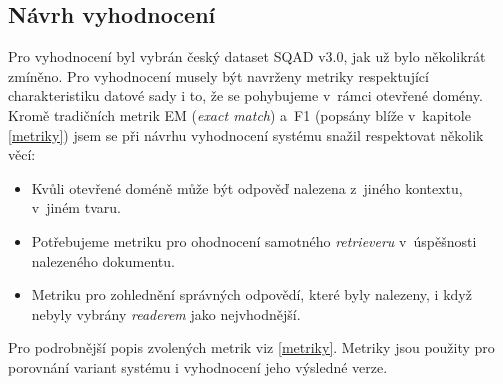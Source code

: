\subsection{Návrh vyhodnocení}
Pro vyhodnocení byl vybrán český dataset SQAD v3.0, jak už bylo několikrát zmíněno. Pro vyhodnocení musely být navrženy metriky respektující charakteristiku datové sady i to, že se pohybujeme v~rámci otevřené domény. Kromě tradičních metrik EM (\emph{exact match}) a~F1 (popsány blíže v~kapitole \ref{metriky}) jsem se při návrhu vyhodnocení systému snažil respektovat několik věcí:
\begin{itemize}
    \item Kvůli otevřené doméně může být odpověď nalezena z~jiného kontextu, v~jiném tvaru.
    \item Potřebujeme metriku pro ohodnocení samotného \emph{retrieveru} v~úspěšnosti nalezeného dokumentu.
    \item Metriku pro zohlednění správných odpovědí, které byly nalezeny, i když nebyly vybrány \emph{readerem} jako nejvhodnější.
\end{itemize}
Pro podrobnější popis zvolených metrik viz \ref{metriky}. Metriky jsou použity pro porovnání variant systému i vyhodnocení jeho výsledné verze.

